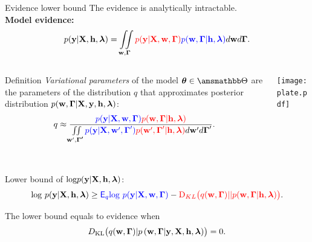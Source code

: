 \documentclass[usenames,dvipsnames,11pt,pdf,utf8,russian,aspectratio=43]{beamer}
\begin{document}
\begin{frame}{Evidence lower bound} 
\footnotesize
The evidence is analytically intractable.\\
\textbf{Model evidence:}
\[
p(\mathbf{y}|\mathbf{X}, \mathbf{h}, \boldsymbol{\lambda}) =
 \iint\limits_{\mathbf{w}, \boldsymbol{\Gamma}}  \textcolor{red}{p(\mathbf{y}|\mathbf{X},\mathbf{w},  \boldsymbol{\Gamma})} \textcolor{blue}{p(\mathbf{w}, \boldsymbol{\Gamma}|\mathbf{h}, \boldsymbol{\lambda})}d\mathbf{w}d{\boldsymbol{\Gamma}}.                         
\]

\begin{columns}
\begin{column}{0.55\textwidth}
  
\begin{block}{Definition}
\textit{Variational parameters} of the model $\boldsymbol{\theta} \in \Tetab$ are the parameters of the distribution $q$ that approximates posterior distribution $p(\mathbf{w}, \boldsymbol{\Gamma}|\mathbf{X}, \mathbf{y}, \mathbf{h}, \boldsymbol{\lambda})$:
\[
    q \approx  \frac{\textcolor{blue}{p(\mathbf{y}|\mathbf{X},\mathbf{w},\boldsymbol{\Gamma})}\textcolor{red}{p(\mathbf{w}, \boldsymbol{\Gamma}|\mathbf{h}, \boldsymbol{\lambda})}}{\iint\limits_{\mathbf{w}', \boldsymbol{\Gamma'}}\textcolor{blue}{p(\mathbf{y}|\mathbf{X},\mathbf{w}',\boldsymbol{\Gamma}')}\textcolor{red}{p(\mathbf{w}', \boldsymbol{\Gamma}'|\mathbf{h}, \boldsymbol{\lambda})}d\mathbf{w}'d\boldsymbol{\Gamma}'}.
\]
\end{block} 

\end{column}
\begin{column}{0.45\textwidth}  %
    \begin{center}
     \texttt{[image: plate.pdf]}
     \end{center}
\end{column}
\end{columns}



~\\Lower bound of $\text{log}{{p}}(\mathbf{y}|\mathbf{X}, \mathbf{h}, \boldsymbol{\lambda})$:
$$                                                                                                                                              
        \text{log}~p(\mathbf{y}|\mathbf{X}, \mathbf{h}, \boldsymbol{\lambda}) \geq 
\textcolor{blue}{\mathsf{E}_q \text{log}~{p(\mathbf{y} | \mathbf{X}, \mathbf{w}, \boldsymbol{\Gamma})}} - \textcolor{red}{\text{D}_{KL}\bigl(q(\mathbf{w}, \boldsymbol{\Gamma})||p(\mathbf{w}, \boldsymbol{\Gamma}| \mathbf{h}, \boldsymbol{\lambda})\bigr)}.
$$ 



The lower bound equals to evidence when $$D_\text{KL}\bigl(q(\mathbf{w}, \boldsymbol{\Gamma})|p\left(\mathbf{w}, \boldsymbol{\Gamma}|\mathbf{y}, \mathbf{X}, \mathbf{h}, \boldsymbol{\lambda}\right)\bigr)=0.$$

\end{frame}      
\end{document}
